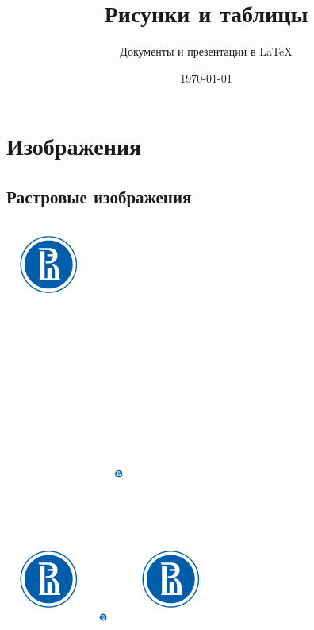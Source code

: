 \documentclass[a4paper,12pt]{article}
\author{Документы и презентации в \LaTeX}
\title{Рисунки и таблицы}
\date{\today}
\begin{document}

\maketitle

\section{Изображения}

\subsection{Растровые изображения}

\includegraphics{znak.jpg}

\includegraphics[scale=0.5]{znak.jpg}
\includegraphics[width=4mm]{znak.jpg}
\includegraphics[width=4mm, height=10cm, keepaspectratio]{znak.jpg}
\includegraphics[draft]{znak.jpg}
\end{document}
